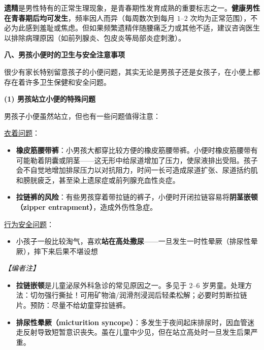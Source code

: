 \documentclass[12pt,a4paper,twoside]{ctexbook}
\begin{document}
\begin{tcolorbox}[colback=pink!5!white,colframe=red!50!black,title=贴心小叮咛]
\textbf{遗精}是男性特有的正常生理现象，是青春期性发育成熟的重要标志之一。\textbf{健康男性在青春期后均可发生}，频率因人而异（每周数次到每月 $1$--$2$ 次均为正常范围），不必为此感到羞耻或焦虑。但如果频繁遗精伴随腰痛乏力或其他不适，建议咨询医生以排除病理原因（如前列腺炎、包皮炎等局部炎症刺激）。
\end{tcolorbox}

\vspace{0.8em}
\noindent\textbf{八、男孩小便时的卫生与安全注意事项}

很少有家长特别留意孩子的小便问题，其实无论是男孩子还是女孩子，在小便上都存在着许多卫生保健和安全问题。

\vspace{0.5em}
\noindent\textbf{(1) 男孩站立小便的特殊问题}

男孩子小便虽然站立，但也有一些问题值得注意：

\underline{衣着问题}：
\begin{itemize}
	\item \textbf{橡皮筋腰带裤}：小男孩大都穿比较方便的橡皮筋腰带裤。小便时橡皮筋腰带有可能勒着阴囊或阴茎——这无形中给尿道增加了压力，使尿液排出受阻。孩子会不自觉地增加排尿压力以对抗阻力，时间一长可造成尿道扩张、尿道括约肌和膀胱疲乏，甚至染上遗尿症或前列腺充血性炎症。
	\item \textbf{拉链裤的风险}：有些男孩穿着带拉链的裤子，小便时开闭拉链容易将\textbf{阴茎嵌顿（zipper entrapment）}，造成外伤性急症。
\end{itemize}

\underline{行为安全问题}：
\begin{itemize}
	\item 小孩子一般比较淘气，喜欢\textbf{站在高处撒尿}——一旦发生一时性晕厥（排尿性晕厥），摔下来后果不堪设想
\end{itemize}

\vspace{0.3em}
\noindent\textit{【编者注】}
\begin{itemize}
	\item \textbf{拉链嵌顿}是儿童泌尿外科急诊的常见原因之一。多见于 $2$--$6$ 岁男童。处理方法：切勿强行撕扯！可用矿物油/润滑剂浸润后轻柔松解；必要时剪断拉链片。预防：尽量不给幼童穿拉链裤。
	\item \textbf{排尿性晕厥（micturition syncope）}：多发生于夜间起床排尿时，因血管迷走反射导致短暂意识丧失。虽在儿童中少见，但在站立高处时一旦发生后果严重。
\end{itemize}
\end{document}
